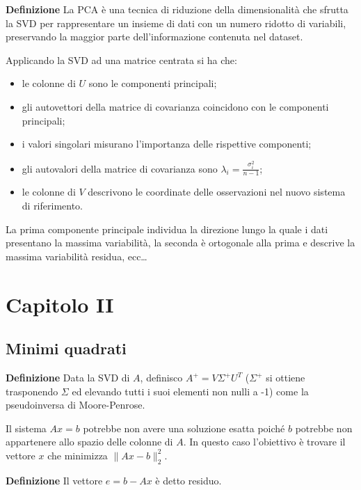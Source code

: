 \documentclass{article}
\newcommand{\df}{\noindent\textbf{Definizione} }
\begin{document}
\df La PCA è una tecnica di riduzione della dimensionalità che sfrutta la SVD per rappresentare un insieme di dati con un numero ridotto di variabili, preservando la maggior parte dell'informazione contenuta nel dataset.\newline

Applicando la SVD ad una matrice centrata si ha che:
\begin{itemize}
    \item le colonne di \(U\) sono le componenti principali;
    \item gli autovettori della matrice di covarianza coincidono con le componenti principali;
    \item i valori singolari misurano l'importanza delle rispettive componenti;
    \item gli autovalori della matrice di covarianza sono $\lambda_i=\frac{\sigma_i^2}{n-1}$;
    \item le colonne di \(V\) descrivono le coordinate delle osservazioni nel nuovo sistema di riferimento.\newline
\end{itemize}

La prima componente principale individua la direzione lungo la quale i dati presentano la massima variabilità, la seconda è ortogonale alla prima e descrive la massima variabilità residua, ecc\ldots

\newpage

\section{Capitolo II}

\subsection{Minimi quadrati}

\df Data la SVD di $A$, definisco $A^+=V\Sigma^+U^T$ ($\Sigma^+$ si ottiene trasponendo $\Sigma$ ed elevando tutti i suoi elementi non nulli a -1) come la pseudoinversa di Moore-Penrose.\newline

Il sistema $Ax=b$ potrebbe non avere una soluzione esatta poiché $b$ potrebbe non appartenere allo spazio delle colonne di $A$. In questo caso l'obiettivo è trovare il vettore $x$ che minimizza $\|Ax-b\|_2^2$.\newline

\df Il vettore $e=b-Ax$ è detto residuo.\newline
\end{document}
